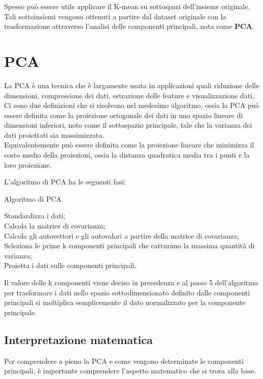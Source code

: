 Spesso può essere utile applicare il K-mean su sottospazi dell'insieme originale. Tali sottoinsiemi vengono ottenuti a partire dal dataset originale con la trasformazione attraverso l'analisi delle componenti principali, nota come \textbf{PCA}.
\\

\section{PCA}

La PCA è una tecnica che è largamente usata in applicazioni quali riduzione delle dimensioni, compressione dei dati, estrazione delle feature e visualizzazione dati.\\
Ci sono due definizioni che si risolvono nel medesimo algoritmo, ossia la PCA può essere definita come la proiezione ortogonale dei dati in uno spazio lineare di dimensioni inferiori, noto come il sottospazio principale, tale che la varianza dei dati proiettati sia massimizzata.\\ Equivalentemente può essere definita come la proiezione lineare che minimizza il costo medio della proiezioni, ossia la distanza quadratica media tra i punti e la loro proiezione\cite{bishop2006pattern}.

L'algoritmo di PCA ha le seguenti fasi:
\newpage
\begin{algorithm}[h]
	\caption{Algoritmo di PCA}
	Standardizza i dati;\\
	Calcola la matrice di covarianza; \\
	Calcola gli autovettori e gli autovalori a partire della matrice di covarianza;\\
	Seleziona le prime k componenti principali che catturano la massima quantità di varianza;\\
	Proietta i dati sulle componenti principali.
	\label{alg:PCA}
\end{algorithm}

Il valore delle k componenti viene deciso in precedenza e al passo 5 dell'algoritmo per trasformare i dati nello spazio sottodimensionato definito dalle componenti principali si moltiplica semplicemente il dato normalizzato per la componente principale.


\subsection{Interpretazione matematica}

Per comprendere a pieno la PCA e come vengono determinate le componenti principali, è importante comprendere l'aspetto matematico che si trova alla base.

